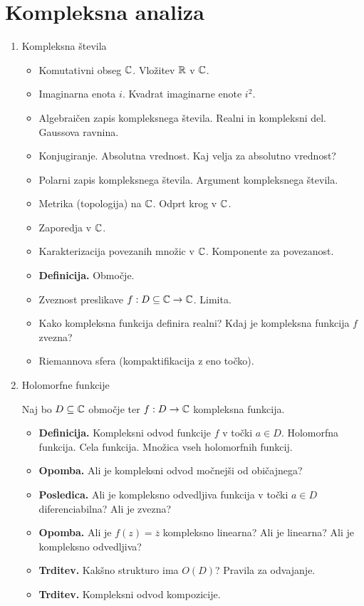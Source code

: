 \section{Kompleksna analiza}

\begin{enumerate}
    \item Kompleksna števila    
    \begin{itemize}
        \item Komutativni obseg \(\mathbb{C}\). Vložitev \(\mathbb{R}\) v \(\mathbb{C}\).
        \item Imaginarna enota \(i\). Kvadrat imaginarne enote \(i^2\).
        \item Algebraičen zapis kompleksnega števila. Realni in kompleksni del. Gaussova ravnina.
        \item Konjugiranje. Absolutna vrednost. Kaj velja za absolutno vrednost?
        \item Polarni zapis kompleksnega števila. Argument kompleksnega števila.
        \item Metrika (topologija) na \(\mathbb{C}\). Odprt krog v \(\mathbb{C}\).
        \item Zaporedja v \(\mathbb{C}\).
        \item Karakterizacija povezanih množic v \(\mathbb{C}\). Komponente za povezanost.
        \item \textbf{Definicija.} Območje.
        \item Zveznost preslikave \(f: D \subseteq \mathbb{C} \to \mathbb{C}\). Limita.
        \item Kako kompleksna funkcija definira realni? Kdaj je kompleksna funkcija \(f\) zvezna?
        \item Riemannova sfera (kompaktifikacija z eno točko).
    \end{itemize}

    \item Holomorfne funkcije
    
    Naj bo \(D \subseteq \mathbb{C}\) območje ter \(f: D \to \mathbb{C}\) kompleksna funkcija.
    \begin{itemize}
        \item \textbf{Definicija.} Kompleksni odvod funkcije \(f\) v točki \(a \in D\). Holomorfna funkcija. Cela funkcija. Množica vseh holomorfnih funkcij. 
        \item \textbf{Opomba.} Ali je kompleksni odvod močnejši od običajnega?
        \item \textbf{Posledica.} Ali je kompleksno odvedljiva funkcija v točki \(a \in D\) diferenciabilna? Ali je zvezna?
        \item \textbf{Opomba.} Ali je \(f(z) = \overline{z}\) kompleksno linearna? Ali je linearna? Ali je kompleksno odvedljiva?
        \item \textbf{Trditev.} Kakšno strukturo ima \(O(D)\)? Pravila za odvajanje.
        \item \textbf{Trditev.} Kompleksni odvod kompozicije.
    \end{itemize}


\end{enumerate}
